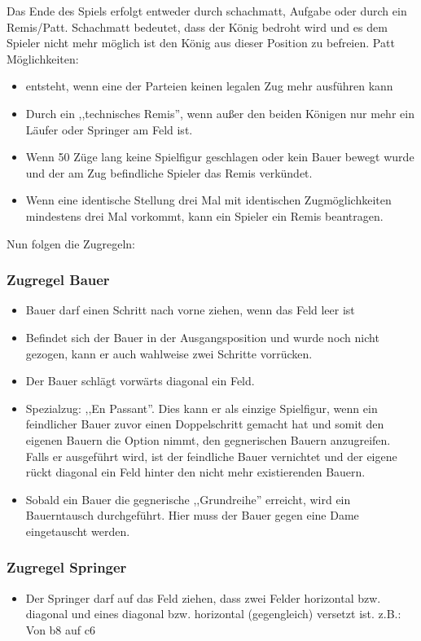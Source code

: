 \documentclass[12pt,a4paper]{article}
\begin{document}
{Das Ende des Spiels erfolgt entweder durch schachmatt, Aufgabe oder durch ein Remis/Patt. Schachmatt bedeutet, dass der König bedroht wird und es dem Spieler nicht mehr möglich ist den König aus dieser Position zu befreien.
Patt Möglichkeiten:
\begin{itemize}
	\item{ entsteht, wenn eine der Parteien keinen legalen Zug mehr ausführen kann }
	\item{Durch ein ,,technisches Remis'', wenn außer den beiden Königen nur mehr ein Läufer oder Springer am Feld ist.}
	\item{Wenn 50 Züge lang keine Spielfigur geschlagen oder kein Bauer bewegt wurde und der am Zug befindliche Spieler das Remis verkündet.}
	\item{Wenn eine identische Stellung drei Mal mit identischen Zugmöglichkeiten mindestens drei Mal vorkommt, kann ein Spieler ein Remis beantragen.}
\end{itemize}

Nun folgen die Zugregeln:

\subsubsection{Zugregel Bauer}
\label{SUBSUBSEC:PAWN}
\begin{itemize}
	\item{Bauer darf einen Schritt nach vorne ziehen, wenn das Feld leer ist}
	\item{Befindet sich der Bauer in der Ausgangsposition und wurde noch nicht gezogen, kann er auch wahlweise zwei Schritte vorrücken.}
	\item{Der Bauer schlägt vorwärts diagonal ein Feld.}
	\item{Spezialzug: ,,En Passant''. Dies kann er als einzige Spielfigur, wenn ein feindlicher Bauer zuvor einen Doppelschritt gemacht hat und somit den eigenen Bauern die Option nimmt, den gegnerischen Bauern anzugreifen. Falls er ausgeführt wird, ist der feindliche Bauer vernichtet und der eigene rückt diagonal ein Feld hinter den nicht mehr existierenden Bauern.}
	\item{Sobald ein Bauer die gegnerische ,,Grundreihe'' erreicht, wird ein Bauerntausch durchgeführt. Hier muss der Bauer gegen eine Dame eingetauscht werden.}
\end{itemize}

\subsubsection{Zugregel Springer}
\label{SUBSUBSEC:JUMPER}
\begin{itemize}
	\item{Der Springer darf auf das Feld ziehen, dass zwei Felder horizontal bzw. diagonal und eines diagonal bzw. horizontal (gegengleich) versetzt ist. z.B.: Von  b8 auf c6}
\end{itemize}
}
\end{document}

